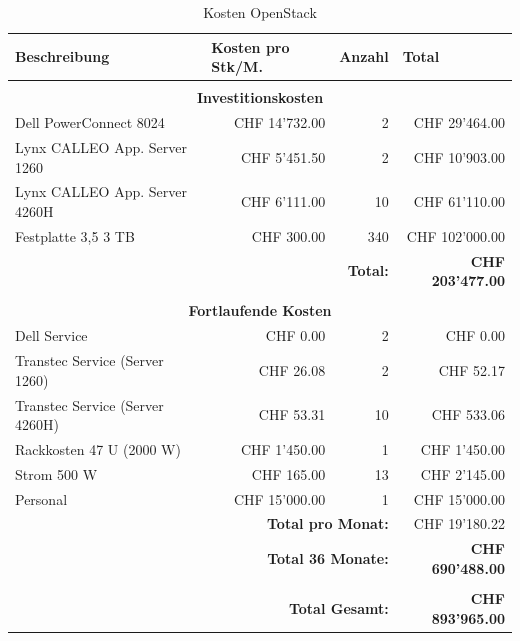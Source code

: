 \begin{table}[htbp]
\caption{Kosten OpenStack}
\begin{small}
\begin{tabular}{|l|r|r|r|}
\hline
\textbf{Beschreibung} & \multicolumn{1}{l|}{\textbf{Kosten pro Stk/M.}} & \multicolumn{1}{l|}{\textbf{Anzahl}} & \multicolumn{1}{l|}{\textbf{Total}} \\ \hline
  \multicolumn{ 4}{c}{} \\  \hline
\multicolumn{ 4}{|c|}{\textbf{Investitionskosten}} \\ \hline
Dell PowerConnect 8024 & CHF 14'732.00 & 2 & CHF 29'464.00 \\ \hline
Lynx CALLEO App. Server 1260 & CHF 5'451.50 & 2 & CHF 10'903.00 \\ \hline
Lynx CALLEO App. Server 4260H & CHF 6'111.00 & 10 & CHF 61'110.00 \\ \hline
Festplatte 3,5 3 TB & CHF 300.00 & 340 & CHF 102'000.00 \\ \hline \hline
  \multicolumn{ 3}{r|}{\textbf{Total:}} & \textbf{CHF 203'477.00} \\ \cline{4-4}
\multicolumn{ 4}{c}{} \\   \hline
\multicolumn{ 4}{|c|}{\textbf{Fortlaufende Kosten}} \\ \hline
Dell Service  & CHF 0.00 & 2 & CHF 0.00 \\ \hline
Transtec Service (Server 1260) & CHF 26.08 & 2 & CHF 52.17 \\ \hline
Transtec Service (Server 4260H) & CHF 53.31 & 10 & CHF 533.06 \\ \hline
 Rackkosten 47 U (2000 W) & CHF 1'450.00 & 1 & CHF 1'450.00 \\ \hline
Strom 500 W  & CHF 165.00 & 13 & CHF 2'145.00 \\ \hline
Personal & CHF 15'000.00 & 1 & CHF 15'000.00 \\ \hline \hline
  \multicolumn{ 3}{r|}{\textbf{Total pro Monat:}} & CHF 19'180.22 \\ \cline{4-4}
  \multicolumn{ 3}{r|}{\textbf{Total 36 Monate:}} & \textbf{CHF 690'488.00} \\ \cline{4-4}
  \multicolumn{ 4}{c}{} \\  \cline{4-4}
  \multicolumn{ 3}{r|}{\textbf{Total Gesamt:}} & \textbf{CHF 893'965.00} \\ \cline{4-4}
\end{tabular}
\end{small}
\label{tab:KostenOpenStackS2}
\end{table}


